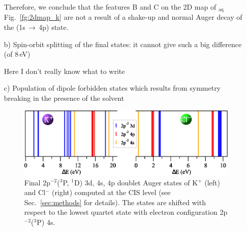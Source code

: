 \begin{enumerate}
Therefore, we conclude that the features B and C on the 2D map of \ki$_{\text{aq}}$ Fig.\ \ref{fg:2dmap_k} are not a result of a shake-up and normal Auger decay of the \ki(1s$\,\rightarrow\,$4p) state.


\item[b)] Spin-orbit splitting of the final states: it cannot give such a big difference (of 8\,eV)

{\color{red} Here I don't really know what to write}


\item[c)] Population of dipole forbidden states which results from symmetry breaking in the presence of the solvent


\begin{figure}[h!]
\centering
\includegraphics[scale=0.6]{figures/fg3_kcl_2p-2nl.eps}
\caption{Final 2p$^{-2}$($^3$P, $^1$D) 3d, 4s, 4p doublet Auger states of K$^{+}$ (left) and Cl$^{-}$ (right) computed at the CIS level (see Sec.\ \ref{sec:methods} for details). The states are shifted with respect to the lowest quartet state with electron configuration 2p$^{-2}$($^3$P) 4s.}
\label{fg:kcl_2p4nl}
\end{figure}



\end{enumerate}
